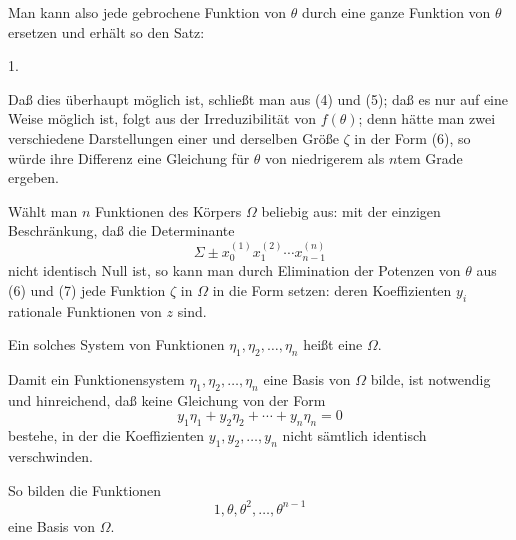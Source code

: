 Man kann also jede gebrochene Funktion von $\theta$ durch eine ganze Funktion von $\theta$ ersetzen und erhält so den Satz:

1. 

Daß dies überhaupt möglich ist, schließt man aus (4) und (5); daß es nur auf eine Weise möglich ist, folgt aus der Irreduzibilität von $f(\theta)$; denn hätte man zwei verschiedene Darstellungen einer und derselben Größe $\zeta$ in der Form (6), so würde ihre Differenz eine Gleichung für $\theta$ von niedrigerem als $n$tem Grade ergeben.

Wählt man $n$ Funktionen des Körpers $\Omega$ beliebig aus:
mit der einzigen Beschränkung, daß die Determinante
\[
\Sigma \pm x_0^{(1)} x_1^{(2)} \cdots x_{n-1}^{(n)}
\]
nicht identisch Null ist, so kann man durch Elimination der Potenzen von $\theta$ aus (6) und (7) jede Funktion $\zeta$ in $\Omega$ in die Form setzen:
deren Koeffizienten $y_i$ rationale Funktionen von $z$ sind.

Ein solches System von Funktionen $\eta_1, \eta_2, \ldots, \eta_n$ heißt eine  $\Omega$.

Damit ein Funktionensystem $\eta_1, \eta_2, \ldots, \eta_n$ eine Basis von $\Omega$ bilde, ist notwendig und hinreichend, daß keine Gleichung von der Form
\[
y_1\eta_1 + y_2\eta_2 + \cdots + y_n\eta_n = 0
\]
bestehe, in der die Koeffizienten $y_1, y_2, \ldots, y_n$ nicht sämtlich identisch verschwinden.

So bilden die Funktionen
\[
1, \theta, \theta^2, \ldots, \theta^{n-1}
\]
eine Basis von $\Omega$.
